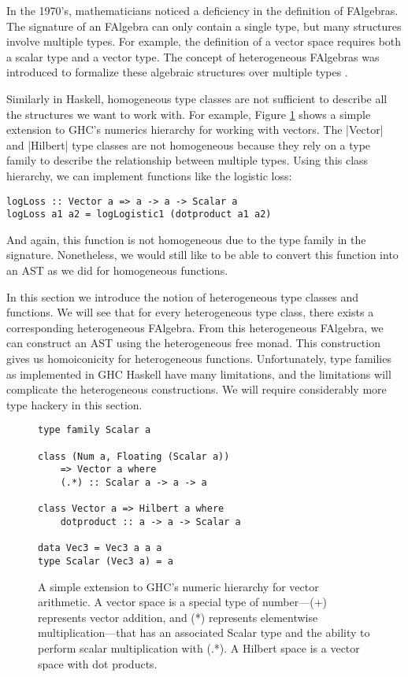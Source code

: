 \documentclass[preprint]{sigplanconf}
\theoremstyle{definition}
\begin{document}
In the 1970's, mathematicians noticed a deficiency in the definition of FAlgebras.
The signature of an FAlgebra can only contain a single type,
but many structures involve multiple types.
For example, the definition of a vector space requires both a scalar type and a vector type.
The concept of heterogeneous FAlgebras was introduced to formalize these algebraic structures over multiple types \cite{birkhoff1970heterogeneous}.

Similarly in Haskell, homogeneous type classes are not sufficient to describe all the structures we want to work with.
For example, Figure \ref{code:vector} shows a simple extension to GHC's numerics hierarchy for working with vectors.
The |Vector| and |Hilbert| type classes are not homogeneous because they rely on a type family to describe the relationship between multiple types.
Using this class hierarchy, we can implement functions like the logistic loss:
\begin{lstlisting}
logLoss :: Vector a => a -> a -> Scalar a
logLoss a1 a2 = logLogistic1 (dotproduct a1 a2)
\end{lstlisting}
And again, this function is not homogeneous due to the type family in the signature.
Nonetheless, we would still like to be able to convert this function into an AST as we did for homogeneous functions.

In this section we introduce the notion of heterogeneous type classes and functions.
We will see that for every heterogeneous type class,
there exists a corresponding heterogeneous FAlgebra.
From this heterogeneous FAlgebra,
we can construct an AST using the heterogeneous free monad.
This construction gives us homoiconicity for heterogeneous functions.
Unfortunately, type families as implemented in GHC Haskell have many limitations,
and the limitations will complicate the heterogeneous constructions.
We will require considerably more type hackery in this section.

\begin{figure}
\begin{lstlisting}
type family Scalar a

class (Num a, Floating (Scalar a))
    => Vector a where
    (.*) :: Scalar a -> a -> a

class Vector a => Hilbert a where
    dotproduct :: a -> a -> Scalar a

data Vec3 = Vec3 a a a
type Scalar (Vec3 a) = a
\end{lstlisting}
\caption{
    A simple extension to GHC's numeric hierarchy for vector arithmetic.
    A vector space is a special type of number---{\ttfamily (+)} represents vector addition, and {\ttfamily (*)} represents elementwise multiplication---that has an associated {\ttfamily Scalar} type and the ability to perform scalar multiplication with {\ttfamily (.*)}.
    A Hilbert space is a vector space with dot products.
}
\label{code:vector}
\end{figure}
\end{document}
